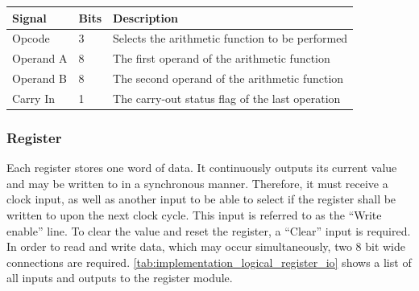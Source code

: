 \begin{table}[H]
    \centering
    \begin{tabular}{|l|l|l|} 
        \hline
        \textbf{\textbf{Signal}} & \textbf{Bits}           & \textbf{Description}                             \\ 
        \hline
        Opcode                   & 3                       & Selects the arithmetic function to be performed  \\ 
        \hline
        Operand A                & 8                       & The first operand of the arithmetic function     \\ 
        \hline
        Operand B                & 8                       & The second operand of the arithmetic function    \\ 
        \hline
        Carry In                 & 1                       & The carry-out status flag of the last operation  \\
        \hline
    \end{tabular}
    \label{tab:implementation_logical_alu_io}
\end{table}

\subsubsection{Register}

Each register stores one word of data. It continuously outputs its current value and may be written to in a synchronous manner. Therefore, it must receive a clock input, as well as another input to be able to select if the register shall be written to upon the next clock cycle. This input is referred to as the ``Write enable'' line. To clear the value and reset the register, a ``Clear'' input is required. In order to read and write data, which may occur simultaneously, two 8 bit wide connections are required. \autoref{tab:implementation_logical_register_io} shows a list of all inputs and outputs to the register module.

